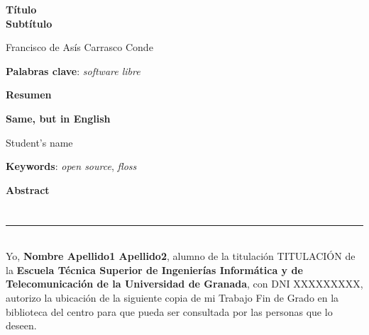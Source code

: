 \thispagestyle{empty}

\begin{center}
{\large\bfseries Título \\ Subtítulo }\\
\end{center}
\begin{center}
Francisco de Asís Carrasco Conde\\
\end{center}


\vspace{0.5cm}
\noindent\textbf{Palabras clave}: \textit{software libre}
\vspace{0.7cm}

\noindent\textbf{Resumen}\\  
	

\cleardoublepage

\begin{center}
	{\large\bfseries Same, but in English}\\
\end{center}
\begin{center}
	Student's name\\
\end{center}
\vspace{0.5cm}
\noindent\textbf{Keywords}: \textit{open source}, \textit{floss}
\vspace{0.7cm}

\noindent\textbf{Abstract}\\


\chapter*{}
\thispagestyle{empty}

\noindent\rule[-1ex]{\textwidth}{2pt}\\[4.5ex]

Yo, \textbf{Nombre Apellido1 Apellido2}, alumno de la titulación TITULACIÓN de la \textbf{Escuela Técnica Superior
de Ingenierías Informática y de Telecomunicación de la Universidad de Granada}, con DNI XXXXXXXXX, autorizo la
ubicación de la siguiente copia de mi Trabajo Fin de Grado en la biblioteca del centro para que pueda ser
consultada por las personas que lo deseen.

\vspace{6cm}

